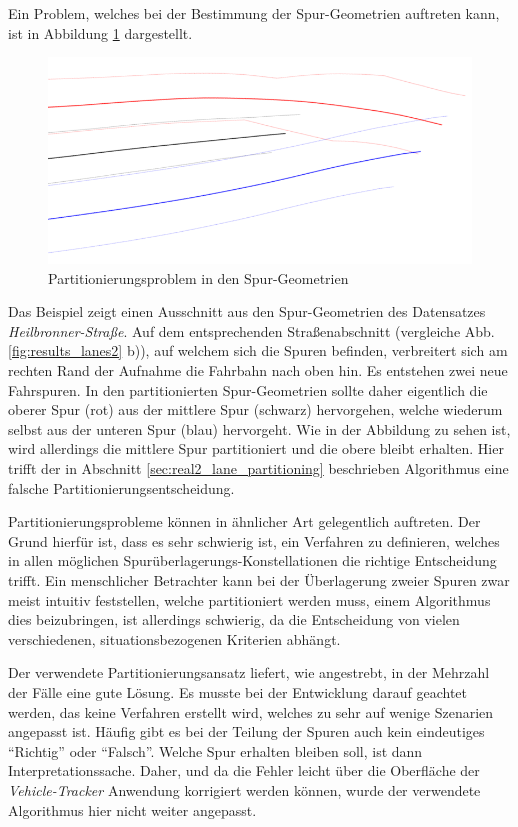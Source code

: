 Ein Problem, welches bei der Bestimmung der Spur-Geometrien auftreten kann, ist in Abbildung
\ref{fig:results_defekts_laneGeos} dargestellt.

\begin{figure}[H]
    \centering
    \includegraphics[width=0.5\linewidth]{resources/img/results/Defekte/Defekt_Part2}
    \caption{Partitionierungsproblem in den Spur-Geometrien}
    \label{fig:results_defekts_laneGeos}
\end{figure}

Das Beispiel zeigt einen Ausschnitt aus den Spur-Geometrien des Datensatzes \textit{Heilbronner-Straße}.
Auf dem entsprechenden Straßenabschnitt (vergleiche Abb. \ref{fig:results_lanes2} b)),
auf welchem sich die Spuren befinden, verbreitert sich am rechten Rand der Aufnahme die Fahrbahn nach oben hin.
Es entstehen zwei neue Fahrspuren. In den partitionierten Spur-Geometrien sollte daher eigentlich die
oberer Spur (rot) aus der mittlere Spur (schwarz) hervorgehen, welche wiederum selbst aus der unteren
Spur (blau) hervorgeht.
Wie in der Abbildung zu sehen ist, wird allerdings die mittlere Spur partitioniert
und die obere bleibt erhalten. Hier trifft der in Abschnitt \ref{sec:real2_lane_partitioning} beschrieben
Algorithmus eine falsche Partitionierungsentscheidung.

Partitionierungsprobleme können in ähnlicher Art gelegentlich auftreten. Der Grund hierfür
ist, dass es sehr schwierig ist, ein Verfahren zu definieren, welches in allen möglichen
Spurüberlagerungs-Konstellationen die richtige Entscheidung trifft.
Ein menschlicher Betrachter kann bei der Überlagerung zweier Spuren zwar meist intuitiv feststellen, welche
partitioniert werden muss, einem Algorithmus dies beizubringen, ist allerdings schwierig,
da die Entscheidung von vielen verschiedenen, situationsbezogenen Kriterien abhängt.

Der verwendete Partitionierungsansatz liefert, wie angestrebt, in der Mehrzahl der Fälle eine gute Lösung.
Es musste bei der Entwicklung darauf geachtet werden, das keine Verfahren erstellt wird, welches zu sehr
auf wenige Szenarien angepasst ist. 
Häufig gibt es bei der Teilung der Spuren auch kein eindeutiges ``Richtig'' oder ``Falsch''.
Welche Spur erhalten bleiben soll, ist dann Interpretationssache. Daher, und da die Fehler
leicht über die Oberfläche der \textit{Vehicle-Tracker} Anwendung korrigiert werden können, wurde der verwendete
Algorithmus hier nicht weiter angepasst.

